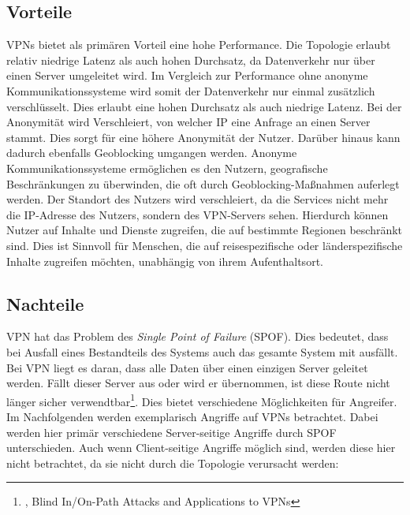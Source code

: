 \subsection{Vorteile}
\label{chap:vpn_advantages}

VPNs bietet als primären Vorteil eine hohe Performance. Die Topologie erlaubt relativ niedrige Latenz als auch hohen Durchsatz, da Datenverkehr nur über einen Server umgeleitet wird. Im Vergleich zur Performance ohne anonyme Kommunikationssysteme wird somit der Datenverkehr nur einmal zusätzlich verschlüsselt. Dies erlaubt eine hohen Durchsatz als auch niedrige Latenz.
Bei der Anonymität wird Verschleiert, von welcher IP eine Anfrage an einen Server stammt. Dies sorgt für eine höhere Anonymität der Nutzer. Darüber hinaus kann dadurch ebenfalls Geoblocking umgangen werden. Anonyme Kommunikationssysteme ermöglichen es den Nutzern, geografische Beschränkungen zu überwinden, die oft durch Geoblocking-Maßnahmen auferlegt werden. Der Standort des Nutzers wird verschleiert, da die Services nicht mehr die IP-Adresse des Nutzers, sondern des VPN-Servers sehen. Hierdurch können Nutzer auf Inhalte und Dienste zugreifen, die auf bestimmte Regionen beschränkt sind. Dies ist Sinnvoll für Menschen, die auf reisespezifische oder länderspezifische Inhalte zugreifen möchten, unabhängig von ihrem Aufenthaltsort.

\subsection{Nachteile}
\label{chap:vpn_disadvantages}

VPN hat das Problem des \textit{Single Point of Failure} (SPOF). Dies bedeutet, dass bei Ausfall eines Bestandteils des Systems auch das gesamte System mit ausfällt. Bei VPN liegt es daran, dass alle Daten über einen einzigen Server geleitet werden. Fällt dieser Server aus oder wird er übernommen, ist diese Route nicht länger sicher verwendtbar\footnote{\cite{AttacksOnVPNs}, Blind In/On-Path Attacks and Applications to VPNs}.
Dies bietet verschiedene Möglichkeiten für Angreifer. Im Nachfolgenden werden exemplarisch Angriffe auf VPNs betrachtet. Dabei werden hier primär verschiedene Server-seitige Angriffe durch SPOF unterschieden. Auch wenn Client-seitige Angriffe möglich sind, werden diese hier nicht betrachtet, da sie nicht durch die Topologie verursacht werden:

